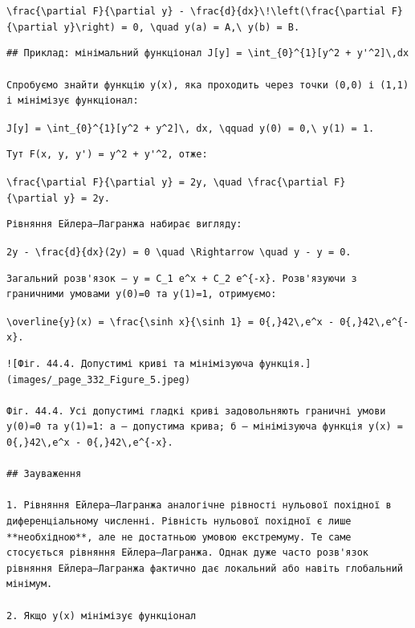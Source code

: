 \documentclass[
  ukrainian,
]{article}
\begin{document}
\texttt{\textbackslash{}frac\{\textbackslash{}partial\ F\}\{\textbackslash{}partial\ y\}\ -\ \textbackslash{}frac\{d\}\{dx\}\textbackslash{}!\textbackslash{}left(\textbackslash{}frac\{\textbackslash{}partial\ F\}\{\textbackslash{}partial\ y\textquotesingle{}\}\textbackslash{}right)\ =\ 0,\ \textbackslash{}quad\ y(a)\ =\ A,\textbackslash{}\ y(b)\ =\ B.}

\begin{verbatim}
## Приклад: мінімальний функціонал J[y] = \int_{0}^{1}[y^2 + y'^2]\,dx

Спробуємо знайти функцію y(x), яка проходить через точки (0,0) і (1,1) і мінімізує функціонал:
\end{verbatim}

\texttt{J{[}y{]}\ =\ \textbackslash{}int\_\{0\}\^{}\{1\}{[}y\^{}2\ +\ y\textquotesingle{}\^{}2{]}\textbackslash{},\ dx,\ \textbackslash{}qquad\ y(0)\ =\ 0,\textbackslash{}\ y(1)\ =\ 1.}

\begin{verbatim}
Тут F(x, y, y') = y^2 + y'^2, отже:
\end{verbatim}

\texttt{\textbackslash{}frac\{\textbackslash{}partial\ F\}\{\textbackslash{}partial\ y\}\ =\ 2y,\ \textbackslash{}quad\ \textbackslash{}frac\{\textbackslash{}partial\ F\}\{\textbackslash{}partial\ y\textquotesingle{}\}\ =\ 2y\textquotesingle{}.}

\begin{verbatim}
Рівняння Ейлера–Лагранжа набирає вигляду:
\end{verbatim}

\texttt{2y\ -\ \textbackslash{}frac\{d\}\{dx\}(2y\textquotesingle{})\ =\ 0\ \textbackslash{}quad\ \textbackslash{}Rightarrow\ \textbackslash{}quad\ y\textquotesingle{}\textquotesingle{}\ -\ y\ =\ 0.}

\begin{verbatim}
Загальний розв'язок — y = C_1 e^x + C_2 e^{-x}. Розв'язуючи з граничними умовами y(0)=0 та y(1)=1, отримуємо:
\end{verbatim}

\texttt{\textbackslash{}overline\{y\}(x)\ =\ \textbackslash{}frac\{\textbackslash{}sinh\ x\}\{\textbackslash{}sinh\ 1\}\ =\ 0\{,\}42\textbackslash{},e\^{}x\ -\ 0\{,\}42\textbackslash{},e\^{}\{-x\}.}

\begin{verbatim}
![Фіг. 44.4. Допустимі криві та мінімізуюча функція.](images/_page_332_Figure_5.jpeg)

Фіг. 44.4. Усі допустимі гладкі криві задовольняють граничні умови y(0)=0 та y(1)=1: а — допустима крива; б — мінімізуюча функція y(x) = 0{,}42\,e^x - 0{,}42\,e^{-x}.

## Зауваження

1. Рівняння Ейлера–Лагранжа аналогічне рівності нульової похідної в диференціальному численні. Рівність нульової похідної є лише **необхідною**, але не достатньою умовою екстремуму. Те саме стосується рівняння Ейлера–Лагранжа. Однак дуже часто розв'язок рівняння Ейлера–Лагранжа фактично дає локальний або навіть глобальний мінімум.

2. Якщо y(x) мінімізує функціонал
\end{verbatim}
\end{document}
